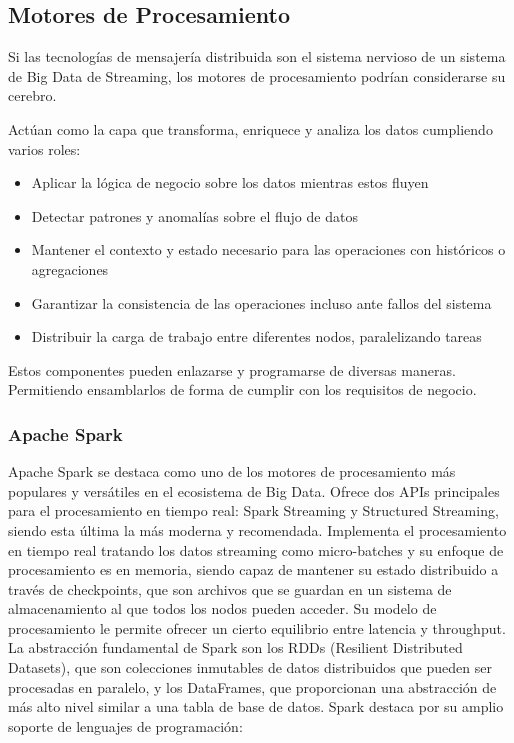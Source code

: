 \subsection{Motores de Procesamiento}

Si las tecnologías de mensajería distribuida son el sistema nervioso de un sistema de Big Data de Streaming, 
los motores de procesamiento podrían considerarse su cerebro.

Actúan como la capa que transforma, enriquece y analiza los datos cumpliendo varios roles:
\begin{itemize}
    \item Aplicar la lógica de negocio sobre los datos mientras estos fluyen
    \item Detectar patrones y anomalías sobre el flujo de datos
    \item Mantener el contexto y estado necesario para las operaciones con históricos o agregaciones
    \item Garantizar la consistencia de las operaciones incluso ante fallos del sistema
    \item Distribuir la carga de trabajo entre diferentes nodos, paralelizando tareas
\end{itemize}

Estos componentes pueden enlazarse y programarse de diversas maneras. Permitiendo ensamblarlos de forma de cumplir 
con los requisitos de negocio.

\subsubsection{Apache Spark}

Apache Spark se destaca como uno de los motores de procesamiento más populares y versátiles en el ecosistema de Big Data.
Ofrece dos APIs principales para el procesamiento en tiempo real: Spark Streaming y Structured Streaming,
siendo esta última la más moderna y recomendada. Implementa el procesamiento en tiempo real tratando los datos streaming
como micro-batches y su enfoque de procesamiento es en memoria, siendo capaz de mantener su estado distribuido a través
de checkpoints, que son archivos que se guardan en un sistema de almacenamiento al que todos los nodos pueden acceder.
Su modelo de procesamiento le permite ofrecer un cierto equilibrio entre latencia y throughput. La abstracción fundamental
de Spark son los RDDs (Resilient Distributed Datasets), que son colecciones inmutables de datos distribuidos que pueden
ser procesadas en paralelo, y los DataFrames, que proporcionan una abstracción de más alto nivel similar a una tabla de
base de datos.
Spark destaca por su amplio soporte de lenguajes de programación:


